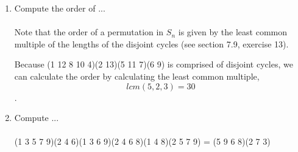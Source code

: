 \documentclass{amsart}
\begin{document}
\begin{enumerate}
    \item Compute the order of ...
    \paragraph{}
    
    Note that the order of a permutation in $S_n$ is given by the least common
    multiple of the lengths of the disjoint cycles (see section 7.9, exercise
    13).
    
    Because (1 12 8 10 4)(2 13)(5 11 7)(6 9) is comprised of disjoint cycles,
    we can calculate the order by calculating the least common multiple,
    \[lcm(5,2,3) = 30\].
    
    \item Compute ...
    \paragraph{}
    
    (1 3 5 7 9)(2 4 6)(1 3 6 9)(2 4 6 8)(1 4 8)(2 5 7 9) = (5 9 6 8)(2 7 3)
    
\end{enumerate}
\end{document}
